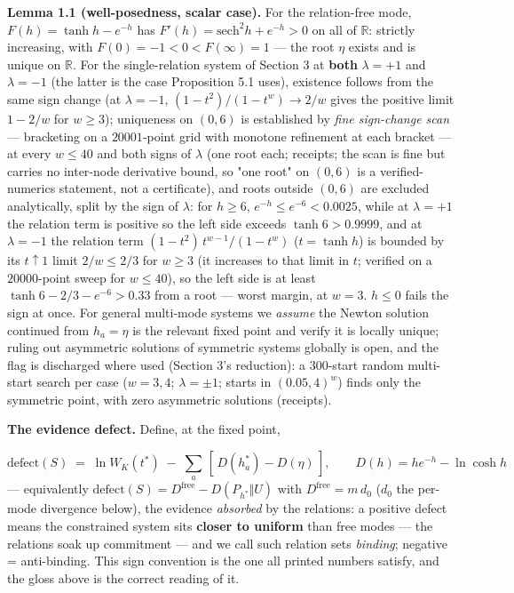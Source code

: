 \documentclass[11pt]{article}
\begin{document}
\textbf{Lemma 1.1 (well-posedness, scalar case).}  For the relation-free mode, $F(h) = \tanh h - e^{-h}$ has $F'(h) = \mathrm{sech}^2 h + e^{-h} > 0$ on all of $\mathbb R$: strictly increasing, with $F(0) = -1 < 0 < F(\infty) = 1$ — the root $\eta$ exists and is unique on $\mathbb R$.  For the single-relation system of Section 3 at \textbf{both} $\lambda = +1$ and $\lambda = -1$ (the latter is the case Proposition 5.1 uses), existence follows from the same sign change (at $\lambda = -1$, $(1-t^2)/(1-t^w) \to 2/w$ gives the positive limit $1 - 2/w$ for $w \ge 3$); uniqueness on $(0, 6)$ is established by \emph{fine sign-change scan} — bracketing on a $20001$-point grid with monotone refinement at each bracket — at every $w \le 40$ and both signs of $\lambda$ (one root each; receipts; the scan is fine but carries no inter-node derivative bound, so "one root" on $(0,6)$ is a verified-numerics statement, not a certificate), and roots outside $(0,6)$ are excluded analytically, split by the sign of $\lambda$: for $h \ge 6$, $e^{-h} \le e^{-6} < 0.0025$, while at $\lambda = +1$ the relation term is positive so the left side exceeds $\tanh 6 > 0.9999$, and at $\lambda = -1$ the relation term $(1-t^2)\,t^{w-1}/(1-t^w)$ ($t = \tanh h$) is bounded by its $t \uparrow 1$ limit $2/w \le 2/3$ for $w \ge 3$ (it increases to that limit in $t$; verified on a $20000$-point sweep for $w \le 40$), so the left side is at least $\tanh 6 - 2/3 - e^{-6} > 0.33$ from a root — worst margin, at $w = 3$.  $h \le 0$ fails the sign at once.  For general multi-mode systems we \emph{assume} the Newton solution continued from $h_a = \eta$ is the relevant fixed point and verify it is locally unique; ruling out asymmetric solutions of symmetric systems globally is open, and the flag is discharged where used (Section 3's reduction): a $300$-start random multi-start search per case ($w = 3, 4$; $\lambda = \pm 1$; starts in $(0.05, 4)^w$) finds only the symmetric point, with zero asymmetric solutions (receipts).

\textbf{The evidence defect.}  Define, at the fixed point,

\[
\mathrm{defect}(S) \;=\; \ln W_K(t^*)
\;-\; \sum_{a}\,[\,D(h_a^*) - D(\eta)\,],
\qquad D(h) = he^{-h} - \ln\cosh h
\]
— equivalently $\mathrm{defect}(S) = D^{\mathrm{free}} - D(P_{h^*}\Vert U)$ with $D^{\mathrm{free}} = m\,d_0$ ($d_0$ the per-mode divergence below), the evidence \emph{absorbed} by the relations: a positive defect means the constrained system sits \textbf{closer to uniform} than free modes — the relations soak up commitment — and we call such relation sets \emph{binding}; negative = anti-binding. This sign convention is the one all printed numbers satisfy, and the gloss above is the correct reading of it.
\end{document}
